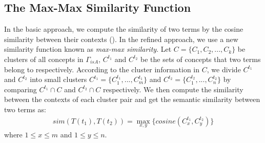 \subsection{The Max-Max Similarity Function}
%
%
In the basic approach, we compute the similarity of two terms by the
cosine similarity between their contexts ().
In the refined approach, we use a new similarity function known as
{\em max-max similarity}.
Let $C=\{C_1,C_2,...,C_k\}$ be clusters of all concepts in $\Gamma_{isA}$,
$C^{t_1}$ and $C^{t_2}$ be the sets of concepts that two terms belong to
respectively. According to the cluster information in $C$,
we divide $C^{t_1}$ and $C^{t_2}$ into small clusters
$C^{t_1}=\{C^{t_1}_{1},..., C^{t_1}_{m}\}$ and
$C^{t_2}=\{C^{t_2}_{1},..., C^{t_2}_{n}\}$ by
comparing $C^{t_1} \cap C$ and $C^{t_2} \cap C$ respectively.
We then compute the similarity between the contexts of each cluster pair
and get the semantic similarity between two terms as:
\begin{equation}
\begin{aligned}
sim(T(t_{1}), T(t_{2})) = \max_{x, y}\{cosine(C^{t_1}_{x}, C^{t_2}_{y})\}
\label{eq:clusterCosine}
\end{aligned}
\end{equation}
where $1\leq x \leq m$ and $1 \leq y \leq n$.

